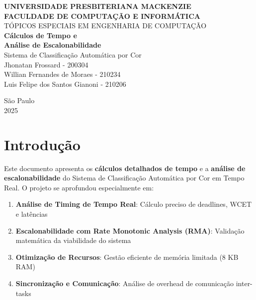 \documentclass[12pt,a4paper]{article}
\begin{document}
\begin{titlepage}
    \centering
    \vspace*{2cm}

    {\Large\bfseries UNIVERSIDADE PRESBITERIANA MACKENZIE}\\[0.5cm]
    {\Large\bfseries FACULDADE DE COMPUTAÇÃO E INFORMÁTICA}\\[3cm]

    {\Large TÓPICOS ESPECIAIS EM ENGENHARIA DE COMPUTAÇÃO}\\[2cm]

    {\huge\bfseries Cálculos de Tempo e\\[0.3cm] Análise de Escalonabilidade}\\[1cm]
    {\Large Sistema de Classificação Automática por Cor}\\[4cm]

    {\large
    Jhonatan Frossard - 200304\\
    Willian Fernandes de Moraes - 210234\\
    Luis Felipe dos Santos Gianoni - 210206
    }\\[3cm]

    \vfill

    {\large São Paulo}\\
    {\large 2025}
\end{titlepage}

\newpage
\tableofcontents
\newpage

\section{Introdução}

Este documento apresenta os \textbf{cálculos detalhados de tempo} e a \textbf{análise de escalonabilidade} do Sistema de Classificação Automática por Cor em Tempo Real. O projeto se aprofundou especialmente em:

\begin{enumerate}
    \item \textbf{Análise de Timing de Tempo Real}: Cálculo preciso de deadlines, WCET e latências
    \item \textbf{Escalonabilidade com Rate Monotonic Analysis (RMA)}: Validação matemática da viabilidade do sistema
    \item \textbf{Otimização de Recursos}: Gestão eficiente de memória limitada (8 KB RAM)
    \item \textbf{Sincronização e Comunicação}: Análise de overhead de comunicação inter-tasks
\end{enumerate}
\end{document}
